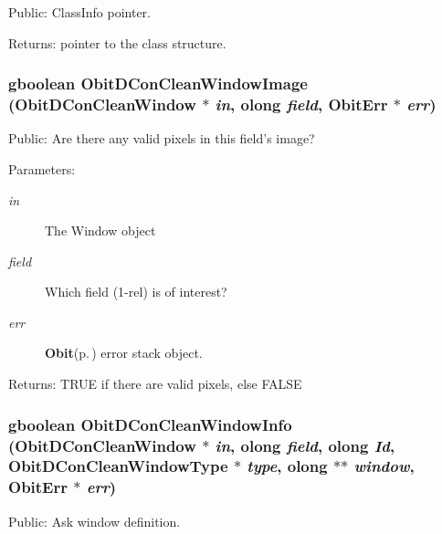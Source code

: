 Public: Class\-Info pointer. 

\begin{Desc}
\item[Returns:]pointer to the class structure. \end{Desc}
\subsubsection{\setlength{\rightskip}{0pt plus 5cm}gboolean Obit\-DCon\-Clean\-Window\-Image ({\bf Obit\-DCon\-Clean\-Window} $\ast$ {\em in}, {\bf olong} {\em field}, {\bf Obit\-Err} $\ast$ {\em err})}\label{ObitDConCleanWindow_8c_a23}


Public: Are there any valid pixels in this field's image? 

\begin{Desc}
\item[Parameters:]
\begin{description}
\item[{\em in}]The Window object \item[{\em field}]Which field (1-rel) is of interest? \item[{\em err}]{\bf Obit}{\rm (p.\,\pageref{structObit})} error stack object. \end{description}
\end{Desc}
\begin{Desc}
\item[Returns:]TRUE if there are valid pixels, else FALSE \end{Desc}
\subsubsection{\setlength{\rightskip}{0pt plus 5cm}gboolean Obit\-DCon\-Clean\-Window\-Info ({\bf Obit\-DCon\-Clean\-Window} $\ast$ {\em in}, {\bf olong} {\em field}, {\bf olong} {\em Id}, {\bf Obit\-DCon\-Clean\-Window\-Type} $\ast$ {\em type}, {\bf olong} $\ast$$\ast$ {\em window}, {\bf Obit\-Err} $\ast$ {\em err})}\label{ObitDConCleanWindow_8c_a17}


Public: Ask window definition. 

